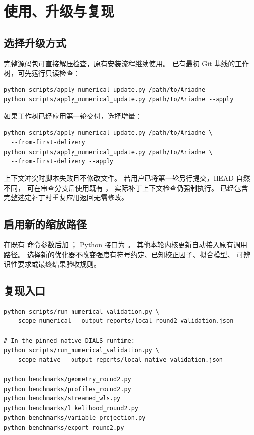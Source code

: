 \documentclass[UTF8,11pt,a4paper,fontset=fandol]{ctexart}
\begin{document}
\section{使用、升级与复现}

\subsection{选择升级方式}

完整源码包可直接解压检查，原有安装流程继续使用。
已有最初 Git 基线的工作树，可先运行只读检查：
\begin{lstlisting}
python scripts/apply_numerical_update.py /path/to/Ariadne
python scripts/apply_numerical_update.py /path/to/Ariadne --apply
\end{lstlisting}
如果工作树已经应用第一轮交付，选择增量：
\begin{lstlisting}
python scripts/apply_numerical_update.py /path/to/Ariadne \
  --from-first-delivery
python scripts/apply_numerical_update.py /path/to/Ariadne \
  --from-first-delivery --apply
\end{lstlisting}
上下文冲突时脚本失败且不修改文件。
若用户已将第一轮另行提交，HEAD 自然不同，
可在审查分支后使用既有 ，
实际补丁上下文检查仍强制执行。
已经包含完整选定补丁时重复应用返回无需修改。

\subsection{启用新的缩放路径}

在既有  命令参数后加
；
Python 接口为
。
其他本轮内核更新自动接入原有调用路径。
选择新的优化器不改变强度有符号约定、已知校正因子、拟合模型、
可辨识性要求或最终结果验收规则。

\subsection{复现入口}

\begin{lstlisting}
python scripts/run_numerical_validation.py \
  --scope numerical --output reports/local_round2_validation.json

# In the pinned native DIALS runtime:
python scripts/run_numerical_validation.py \
  --scope native --output reports/local_native_validation.json

python benchmarks/geometry_round2.py
python benchmarks/profiles_round2.py
python benchmarks/streamed_wls.py
python benchmarks/likelihood_round2.py
python benchmarks/variable_projection.py
python benchmarks/export_round2.py
\end{lstlisting}
\end{document}
